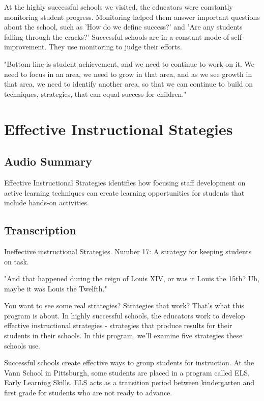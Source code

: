At the highly successful schools we visited, the educators were constantly monitoring student progress. Monitoring helped them answer important questions about the school, such as 'How do we define success?' and 'Are any students falling through the cracks?' Successful schools are in a constant mode of self-improvement. They use monitoring to judge their efforts.

"Bottom line is student achievement, and we need to continue to work on it. We need to focus in an area, we need to grow in that area, and as we see growth in that area, we need to identify another area, so that we can continue to build on techniques, strategies, that can equal success for children."

\section{Effective Instructional Stategies}

\subsection{Audio Summary}

Effective Instructional Strategies identifies how focusing staff development on active learning techniques can create learning opportunities for students that include hands-on activities.

\subsection{Transcription}

Ineffective instructional Strategies. Number 17: A strategy for keeping students on task.

"And that happened during the reign of Louis XIV, or was it Louis the 15th? Uh, maybe it was Louis the Twelfth."

You want to see some real strategies? Strategies that work? That's what this program is about. In highly successful schools, the educators work to develop effective instructional strategies - strategies that produce results for their students in their schools. In this program, we'll examine five strategies these schools use.

Successful schools create effective ways to group students for instruction. At the Vann School in Pittsburgh, some students are placed in a program called ELS, Early Learning Skills. ELS acts as a transition period between kindergarten and first grade for students who are not ready to advance.

